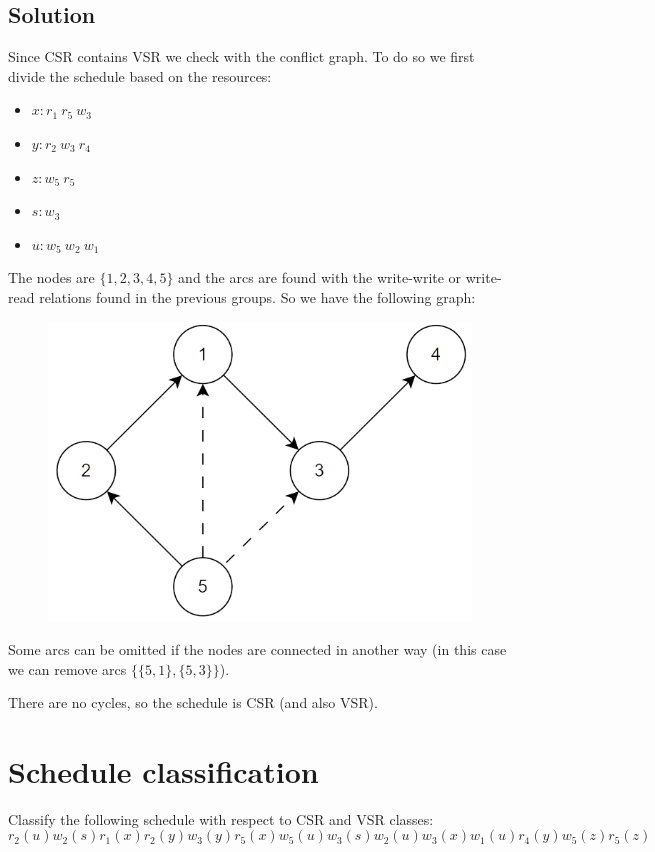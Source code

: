 \documentclass[12pt, a4paper]{report}
\begin{document}
    \subsection*{Solution}
        Since CSR contains VSR we check with the conflict graph. To do so we first divide the schedule based on the resources: 
        \begin{itemize}
            \item $x: r_1 \: r_5 \:w_3$
            \item $y: r_2 \: w_3 \:r_4$
            \item $z: w_5 \: r_5$
            \item $s: w_3$
            \item $u: w_5 \: w_2 \:w_1$
        \end{itemize}
        The nodes are $\{1,2,3,4,5\}$ and the arcs are found with the write-write or write-read relations found in the previous groups. 
        So we have the following graph:
        \begin{figure}[H]
            \centering
            \includegraphics[width=0.5\linewidth]{images/conflictgraph.png}
        \end{figure}
        Some arcs can be omitted if the nodes are connected in another way (in this case we can remove arcs $\{\{5,1\},\{5,3\}\}$). 

        There are no cycles, so the schedule is CSR (and also VSR). 

    \newpage
    
    \section{Schedule classification}
        Classify the following schedule with respect to CSR and VSR classes:  
        \[r_2(u) w_2(s) r_1(x) r_2(y) w_3(y) r_5(x) w_5(u) w_3(s)w_2(u) w_3(x) w_1(u) r_4(y) w_5(z) r_5(z)\]
\end{document}

